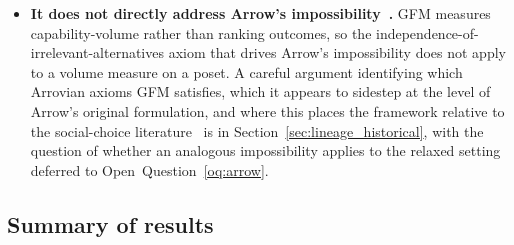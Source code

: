 \begin{itemize}
\item
\textbf{It does not directly address Arrow's
impossibility~\citep{arrow1951social}.}
GFM measures capability-volume rather than ranking outcomes, so
the independence-of-irrelevant-alternatives axiom that drives
Arrow's impossibility does not apply to a volume measure on a
poset.  A careful argument identifying which Arrovian axioms GFM
satisfies, which it appears to sidestep at the level of Arrow's
original formulation, and where this places the framework
relative to the social-choice
literature~\citep{sen1970collective} is in
Section~\ref{sec:lineage_historical}, with the question of
whether an analogous impossibility applies to the relaxed
setting deferred to Open~Question~\ref{oq:arrow}.
\end{itemize}

\subsection{Summary of results}
\label{sec:results_summary}

